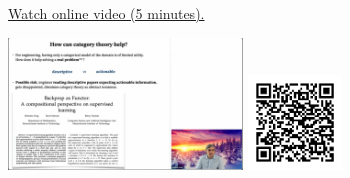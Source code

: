 
\begin{minipage}{10cm}
    \href{https://act4e-spring21.netlify.app/videos/spring2021-functorial-comp-a:how-cat-helps.html}{Watch online video (5 minutes).}
        
    \href{https://act4e-spring21.netlify.app/videos/spring2021-functorial-comp-a:how-cat-helps.html}{\includegraphics[height=3.5cm]{spring2021-functorial-comp-a:how-cat-helps/thumbnails.jpg}}
    \href{https://act4e-spring21.netlify.app/videos/spring2021-functorial-comp-a:how-cat-helps.html}{\includegraphics[height=2.5cm]{spring2021-functorial-comp-a:how-cat-helps/qrcode.png}}
\end{minipage}
